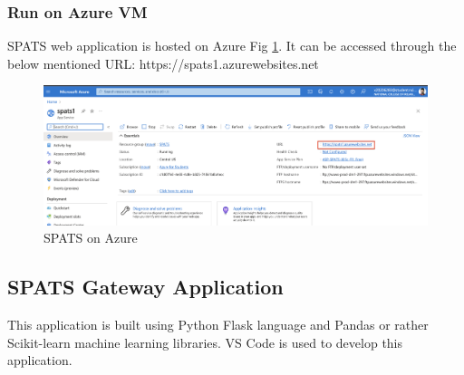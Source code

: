 \documentclass[10pt]{article}
\begin{document}
\subsubsection{Run on Azure VM}
SPATS web application is hosted on Azure Fig \ref{fig:10}. It can be accessed through the below mentioned URL:
\newline https://spats1.azurewebsites.net
\begin{figure}[H]
    \begin{center}
        \includegraphics[width=0.7\linewidth, frame]{CA2-template/CM18.png}
       \caption{SPATS on Azure \label{fig:10}}
    \end{center}
\end{figure}

\subsection{SPATS Gateway Application}
This application is built using Python Flask language and Pandas or rather Scikit-learn machine learning libraries. VS Code is used to develop this application.
\end{document}
